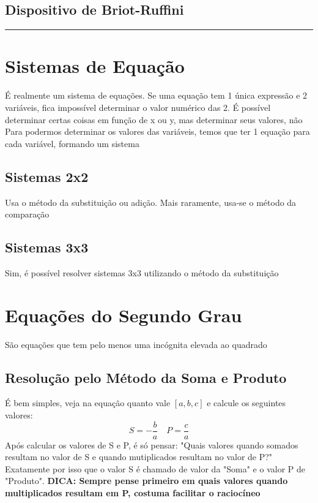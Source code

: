 \documentclass{article}
\begin{document}
\subsection{Dispositivo de Briot-Ruffini}

\vspace{15pt}
\hrule
\vspace{15pt}
\section{Sistemas de Equação}
É realmente um sistema de equações. Se uma equação tem 1 única expressão e 2 variáveis, fica impossível determinar o valor numérico das 2. É possível determinar certas coisas em função de x ou y, mas determinar seus valores, não
\\[5pt]
Para podermos determinar os valores das variáveis, temos que ter 1 equação para cada variável, formando um sistema
\subsection{Sistemas 2x2}
Usa o método da substituição ou adição. Mais raramente, usa-se o método da comparação

\subsection{Sistemas 3x3}
Sim, é possível resolver sistemas 3x3 utilizando o método da substituição

\section{Equações do Segundo Grau}
São equações que tem pelo menos uma incógnita elevada ao quadrado
\subsection{Resolução pelo Método da Soma e Produto}
É bem simples, veja na equação quanto vale $[a, b, c]$ e calcule os seguintes valores:
 \[
    S = -\frac{b}{a} \quad P = \frac{c}{a}
\]
Após calcular os valores de S e P, é só pensar: "Quais valores quando somados resultam no valor de S e quando mutiplicados resultam no valor de P?"
\\
Exatamente por isso que o valor S é chamado de valor da "Soma" e o valor P de "Produto". \textbf{DICA: Sempre pense primeiro em quais valores quando multiplicados resultam em P, costuma facilitar o raciocíneo}
\end{document}
